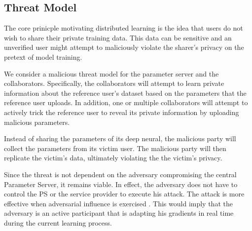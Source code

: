 \documentclass[conference]{IEEEtran}
\begin{document}
\subsection{Threat Model}
The core prinicple motivating distributed learning is the idea that users do not wish to share their private training data. This data can be sensitive and an unverified user might attempt to maliciously violate the sharer's privacy on the pretext of model training.

We consider a malicious threat model for the parameter server and the collaborators. Specifically, the collaborators will attempt to learn private information about the reference user's dataset based on the parameters that the reference user uploads. 
In addition, one or multiple  collaborators will attempt to actively trick the reference user to reveal its private information by uploading malicious parameters. 

Instead of sharing the parameters of its deep neural, the malicious party will collect the parameters from its victim user. The malicious party will then replicate the victim's data, ultimately violating the the victim's privacy.
  
Since the threat is not dependent on the adversary compromising the
central Parameter Server, it remains viable. In effect, the adversary does not have to control the PS or the service
provider to execute his attack. The attack is more effective when adversarial influence is exercised \cite{hitaj2017deep}. This would imply that the adversary is an active participant that is adapting his gradients in real time during the current learning process.


\end{document}
